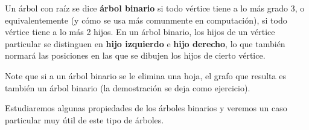 \begin{definicion}
Un árbol con raíz se dice {\bf árbol binario} si todo vértice tiene a lo más grado 3, o equivalentemente (y cómo se usa más comunmente en computación), si todo vértice tiene a lo más 2 hijos.
En un árbol binario, los hijos de un vértice particular se distinguen en {\bf hijo izquierdo} e {\bf hijo derecho}, lo que también normará las posiciones en las que se dibujen los hijos de cierto vértice.

Note que si a un árbol binario se le elimina una hoja, el grafo que resulta es también un árbol binario (la demostración se deja como ejercicio).
\end{definicion}

Estudiaremos algunas propiedades de los árboles binarios y veremos un caso particular muy útil de este tipo de árboles.


